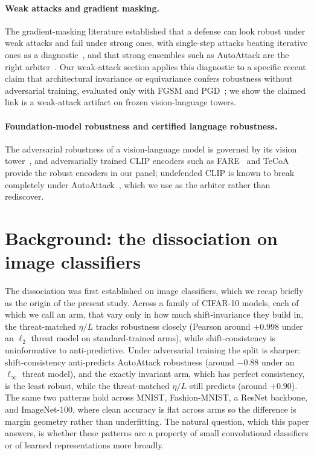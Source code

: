\documentclass{article}
\newcommand{\etaL}{\ensuremath{\eta/L}}
\begin{document}
\paragraph{Weak attacks and gradient masking.}
The gradient-masking literature established that a defense can look robust under weak attacks and fail
under strong ones, with single-step attacks beating iterative ones as a diagnostic~\citep{athalye,carlinieval}, and that strong
ensembles such as AutoAttack are the right arbiter~\citep{autoattack}. Our weak-attack section applies this diagnostic to
a specific recent claim that architectural invariance or equivariance confers robustness without
adversarial training, evaluated only with FGSM and PGD~\citep{equivariance}; we show the claimed link is a weak-attack
artifact on frozen vision-language towers.

\paragraph{Foundation-model robustness and certified language robustness.}
The adversarial robustness of a vision-language model is governed by its vision tower~\citep{fare}, and
adversarially trained CLIP encoders such as FARE~\citep{fare} and TeCoA~\citep{tecoa} provide the robust
encoders in our panel; undefended CLIP is known to break completely under AutoAttack~\citep{pmgaft}, which
we use as the arbiter rather than rediscover.

\section{Background: the dissociation on image classifiers}
\label{sec:cifar}
The dissociation was first established on image classifiers, which we recap briefly as the origin of
the present study. Across a family of CIFAR-10 models, each of which we call an arm, that vary only in
how much shift-invariance they
build in, the threat-matched $\etaL$ tracks robustness closely (Pearson around $+0.998$ under an
$\ell_2$ threat model on standard-trained arms), while shift-consistency is uninformative to
anti-predictive. Under adversarial training the split is sharper: shift-consistency anti-predicts
AutoAttack robustness (around $-0.88$ under an $\ell_\infty$ threat model), and the exactly invariant
arm, which has perfect consistency, is the least robust, while the threat-matched $\etaL$ still
predicts (around $+0.90$). The same two patterns hold across MNIST, Fashion-MNIST, a ResNet backbone,
and ImageNet-100, where clean accuracy is flat across arms so the difference is margin geometry rather
than underfitting. The natural question, which this paper answers, is whether these patterns are a
property of small convolutional classifiers or of learned representations more broadly.
\end{document}
